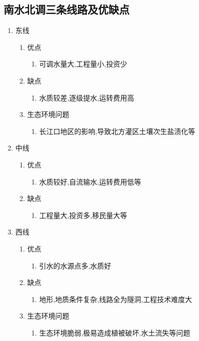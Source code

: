 \documentclass[a4paper]{article}
\begin{document}
    \subsection{南水北调三条线路及优缺点}
    \begin{enumerate}
        \item 东线
        \begin{enumerate}
            \item 优点
            \begin{enumerate}
                \item 可调水量大,工程量小,投资少
            \end{enumerate}
            \item 缺点
            \begin{enumerate}
                \item 水质较差,逐级提水,运转费用高
            \end{enumerate}
            \item 生态环境问题
            \begin{enumerate}
                \item 长江口地区的影响,导致北方灌区土壤次生盐渍化等
            \end{enumerate}
        \end{enumerate}
        \item 中线
        \begin{enumerate}
            \item 优点
            \begin{enumerate}
                \item 水质较好,自流输水,运转费用低等
            \end{enumerate}
            \item 缺点
            \begin{enumerate}
                \item 工程量大,投资多,移民量大等
            \end{enumerate}
        \end{enumerate}
        \item 西线
        \begin{enumerate}
            \item 优点
            \begin{enumerate}
                \item 引水的水源点多,水质好
            \end{enumerate}
            \item 缺点
            \begin{enumerate}
                \item 地形,地质条件复杂,线路全为隧洞,工程技术难度大
            \end{enumerate}
            \item 生态环境问题
            \begin{enumerate}
                \item 生态环境脆弱,极易造成植被破坏,水土流失等问题
            \end{enumerate}
        \end{enumerate}
    \end{enumerate}
\end{document}
